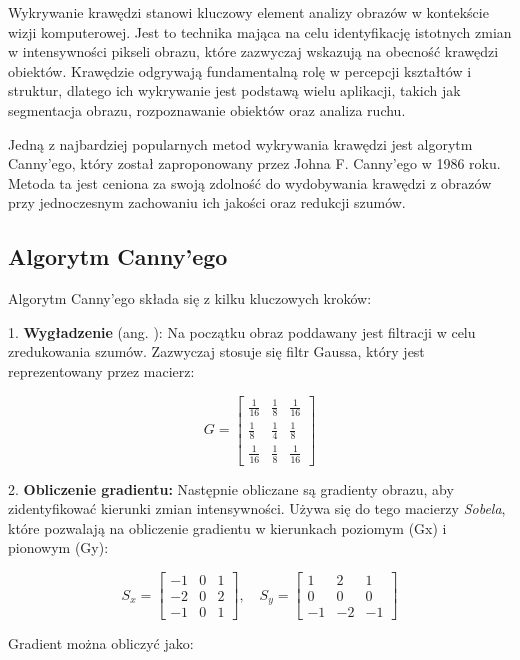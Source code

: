 Wykrywanie krawędzi stanowi kluczowy element analizy obrazów w kontekście wizji komputerowej. Jest to technika mająca na celu identyfikację istotnych zmian w intensywności pikseli obrazu, które zazwyczaj wskazują na obecność krawędzi obiektów. Krawędzie odgrywają fundamentalną rolę w percepcji kształtów i struktur, dlatego ich wykrywanie jest podstawą wielu aplikacji, takich jak segmentacja obrazu, rozpoznawanie obiektów oraz analiza ruchu.

Jedną z najbardziej popularnych metod wykrywania krawędzi jest algorytm Canny’ego, który został zaproponowany przez Johna F. Canny'ego w 1986 roku. Metoda ta jest ceniona za swoją zdolność do wydobywania krawędzi z obrazów przy jednoczesnym zachowaniu ich jakości oraz redukcji szumów.

\subsection{Algorytm Canny’ego}

Algorytm Canny’ego składa się z kilku kluczowych kroków:

1. \textbf{Wygładzenie} (ang. ): Na początku obraz poddawany jest filtracji w celu zredukowania szumów. Zazwyczaj stosuje się filtr Gaussa, który jest reprezentowany przez macierz:

\[
G = \begin{bmatrix}
\frac{1}{16} & \frac{1}{8} & \frac{1}{16} \\
\frac{1}{8} & \frac{1}{4} & \frac{1}{8} \\
\frac{1}{16} & \frac{1}{8} & \frac{1}{16}
\end{bmatrix}
\]

2. \textbf{Obliczenie gradientu:} Następnie obliczane są gradienty obrazu, aby zidentyfikować kierunki zmian intensywności. Używa się do tego macierzy \textit{Sobela}, które pozwalają na obliczenie gradientu w kierunkach poziomym (Gx) i pionowym (Gy):

\[
S_x = \begin{bmatrix}
-1 & 0 & 1 \\
-2 & 0 & 2 \\
-1 & 0 & 1
\end{bmatrix}, \quad 
S_y = \begin{bmatrix}
1 & 2 & 1 \\
0 & 0 & 0 \\
-1 & -2 & -1
\end{bmatrix}
\]

Gradient można obliczyć jako:

